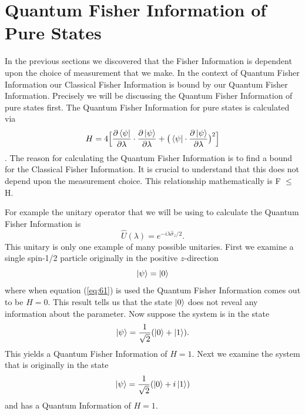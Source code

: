 \documentclass[twocolumn]{article}
\begin{document}
\section*{Quantum Fisher Information of Pure States}
In the previous sections we discovered that the Fisher Information is dependent upon the choice of measurement that we make. In the context of Quantum Fisher Information our Classical Fisher Information is bound by our Quantum Fisher Information. Precisely we will be discussing the Quantum Fisher Information of pure states first. The Quantum Fisher Information for pure states is calculated via
\begin{equation} \label{eq:61}
H=4\Big[\frac{\partial\bra{\psi}}{\partial\lambda}\cdot\frac{\partial\ket{\psi}}{\partial\lambda}+\big(\bra{\psi}\cdot\frac{\partial\ket{\psi}}{\partial\lambda}\big)^2\Big]
\end{equation}
\cite{D. Collins}. The reason for calculating the Quantum Fisher Information is to find a bound for the Classical Fisher Information. It is crucial to understand that this does not depend upon the measurement choice. This relationship mathematically is F $\leq$ H. 

For example the unitary operator that we will be using to calculate the Quantum Fisher Information is
\begin{equation} \label{eq:62}
\hat{U}(\lambda)=e^{-i\lambda\hat{\sigma}_z/2}.
\end{equation}
This unitary is only one example of many possible unitaries. First we examine a single spin-1/2 particle originally in the positive $z$-direction
\begin{equation} \label{eq:63}
\ket{\psi}=\ket{0}
\end{equation}
where when equation (\ref{eq:61}) is used the Quantum Fisher Information comes out to be $H=0$. This result tells us that the state $\ket{0}$ does not reveal any information about the parameter. Now suppose the system is in the state
\begin{equation} \label{eq:64}
\ket{\psi}=\frac{1}{\sqrt{2}}(\ket{0}+\ket{1}).
\end{equation}
This yields a Quantum Fisher Information of $H=1$. Next we examine the system that is originally in the state
\begin{equation} \label{eq:65}
\ket{\psi}=\frac{1}{\sqrt{2}}(\ket{0}+i\ket{1})
\end{equation}
and has a Quantum Information of $H=1$.
\end{document}

